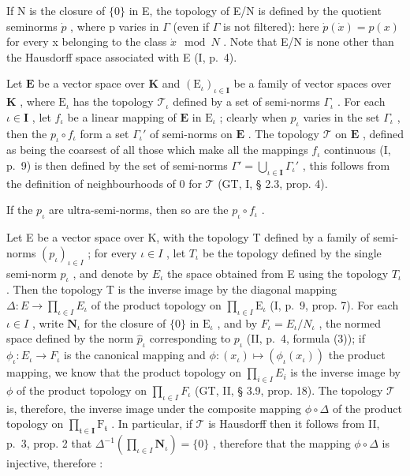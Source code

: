 If N is the closure of \(\{0\}\) in E, the topology of E/N is defined by the quotient seminorms \(\dot{p}\) , where p varies in \(\Gamma\) (even if \(\Gamma\) is not filtered): here \(\dot{p}(\dot{x}) = p(x)\) for every x belonging to the class \(\dot{x} \mod N\) . Note that E/N is none other than the Hausdorff space associated with E (I, p.~4).

Let \(\mathbf{E}\) be a vector space over \(\mathbf{K}\) and \((\mathrm{E}_{\iota})_{\iota \in \mathbf{I}}\) be a family of vector spaces over \(\mathbf{K}\) , where \(\mathrm{E}_{\iota}\) has the topology \(\mathcal{T}_{\iota}\) defined by a set of semi-norms \(\Gamma_{\iota}\) . For each \(\iota \in \mathbf{I}\) , let \(f_{\iota}\) be a linear mapping of \(\mathbf{E}\) in \(\mathrm{E}_{\iota}\) ; clearly when \(p_{\iota}\) varies in the set \(\Gamma_{\iota}\) , then the \(p_{\iota} \circ f_{\iota}\) form a set \(\Gamma_{\iota}'\) of semi-norms on \(\mathbf{E}\) . The topology \(\mathcal{T}\) on \(\mathbf{E}\) , defined as being the coarsest of all those which make all the mappings \(f_{\iota}\) continuous (I, p.~9) is then defined by the set of semi-norms \(\Gamma' = \bigcup_{\iota \in \mathbf{I}} \Gamma_{\iota}'\) , this follows from the definition of neighbourhoods of 0 for \(\mathcal{T}\) (GT, I, § 2.3, prop. 4).

If the \(p_{\iota}\) are ultra-semi-norms, then so are the \(p_{\iota} \circ f_{\iota}\) .

Let E be a vector space over K, with the topology T defined by a family of semi-norms \((p_{\iota})_{\iota \in I}\) ; for every \(\iota \in I\) , let \(T_{\iota}\) be the topology defined by the single semi-norm \(p_{\iota}\) , and denote by \(E_{\iota}\) the space obtained from E using the topology \(T_{\iota}\) . Then the topology T is the inverse image by the diagonal mapping \(\Delta : E \to \prod_{\iota \in I} E_{\iota}\) of the product topology on \(\prod_{\iota \in I} \mathrm{E}_{\iota}\) (I, p.~9, prop. 7). For each \(\iota \in I\) , write \(\mathbf {N} _ {\iota}\) for the closure of \(\{0 \}\) in \(\mathrm{E} _ {\iota}\) , and by \(F_{\iota} = E_{\iota}/N_{\iota}\) , the normed space defined by the norm \(\hat{p}_{\iota}\) corresponding to \(p_{\iota}\) (II, p.~4, formula (3)); if \(\phi_{\iota}: E_{\iota} \to F_{\iota}\) is the canonical mapping and \(\phi : (x_{\iota}) \mapsto (\phi_{\iota}(x_{\iota}))\) the product mapping, we know that the product topology on \(\prod_{i \in I} E_{i}\) is the inverse image by \(\phi\) of the product topology on \(\prod_{\iota \in I}F_{\iota}\) (GT, II, § 3.9, prop. 18). The topology \(\mathcal{T}\) is, therefore, the inverse image under the composite mapping \(\phi \circ \Delta\) of the product topology on \(\prod_{\mathfrak{t}\in \mathbf{I}}\mathrm{F}_{\mathfrak{t}}\) . In particular, if \(\mathcal{T}\) is Hausdorff then it follows from II, p.~3, prop. 2 that \(\Delta^{-1}(\prod_{\iota \in I} \mathbf{N}_{\iota}) = \{0 \}\) , therefore that the mapping \(\phi \circ \Delta\) is injective, therefore :

